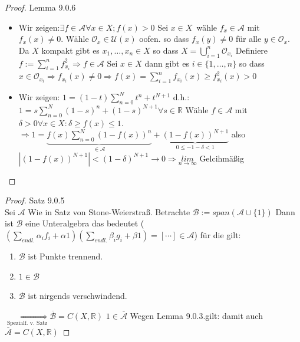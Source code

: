 \begin{proof}{Lemma 9.0.6}\\
    \begin{itemize}
        \item[(1.)] Wir zeigen:$\exists f \in \mathcal{A} \forall x \in X; f(x)>0$
        Sei $ x \in X \,$ 
        wähle $f_x \in \mathcal{A}$ mit $f_x(x) \neq 0$.
        Wähle $\mathcal{O}_x \in \mathscr{U}(x)$ oofen.
        so dass $f_x(y) \neq 0$ für alle $y \in \mathcal{O}_x$.
        Da $X$ kompakt gibt es $x_1, \ldots, x_n \in X$ so dass
        $X = \bigcup_{i=1}^{n} \mathcal{O}_{x_i}$
        Definiere $f := \sum_{i=1}^{n} f_{x_i}^2 \Rightarrow f \in \mathcal{A}$
        Sei $x \in X$ dann gibt es $i \in \{1, \ldots, n\}$ so dass
        $x \in \mathcal{O}_{x_i} \Rightarrow f_{x_i}(x) \neq 0 
        \Rightarrow f(x) =\sum_{i=1}^{n} f_{x_i}(x) \geq  f_{x_i}^2(x) > 0$
        \item[(2.)] Wir zeigen: $1 = (1-t)\sum_{n=0}^{N}t^n + t^{N+1}$ d.h.: 
        $1 = s\sum_{n=0}^{N}(1-s)^n + (1-s)^{N+1} \forall s \in \mathbb{R}$
        Wähle $f \in \mathcal{A}$ mit $\delta > 0 \forall x \in X: \delta \geq f(x)\leq 1$. 
             $\Rightarrow 1 = \underbrace{f(x)\sum_{n=0}^{N}(1-f(x))^n}_{\in \mathcal{A}}+
            \underbrace{(1-f(x))^{N+1}}_{0\leq -1-\delta < 1}$ also 
            $|(1-f(x))^{N+1}| < (1-\delta)^{N+1}\to 0 \Rightarrow
             \underset{n\to \infty}{lim}$ Gelcihmäßig
    \end{itemize}
\end{proof}


\begin{proof}{Satz 9.0.5}\\
    Sei $\mathcal{A}$ Wie in Satz von Stone-Weierstraß. Betrachte $\mathcal{B}:=span(\mathcal{A}\cup \{1\})$
    Dann ist $\mathcal{B}$ eine Unteralgebra das bedeutet ($(\sum_{endl.}\alpha_i f_i + \alpha 1)(\sum_{endl.}\beta_i g_i + \beta 1) = [\cdots] \in \mathcal{A}$) für die gilt:
    \begin{enumerate}
        \item $\mathcal{B}$ ist Punkte trennend.
        \item $1 \in \mathcal{B}$

        \item $\mathcal{B}$ ist nirgends verschwindend.
    \end{enumerate}
    $\underset{\text{Spezialf. v. Satz}}{\Longrightarrow} \overline{\mathcal{B}}= C(X,\mathbb{R})$
    $1 \in \overline{\mathcal{A}}$ Wegen Lemma 9.0.3.gilt: damit auch 
    $\overline{\mathcal{A}} = C(X,\mathbb{R})$ 
\end{proof}

